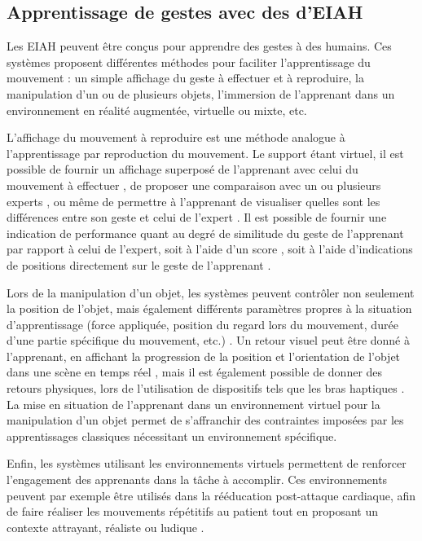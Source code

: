 \subsection{Apprentissage de gestes avec des d'EIAH}
Les EIAH peuvent être conçus pour apprendre des gestes à des humains. Ces systèmes proposent différentes méthodes pour faciliter l'apprentissage du mouvement : un simple affichage du geste à effectuer et à reproduire, la manipulation d'un ou de plusieurs objets, l'immersion de l'apprenant dans un environnement en réalité augmentée, virtuelle ou mixte, etc.

L'affichage du mouvement à reproduire est une méthode analogue à l'apprentissage par reproduction du mouvement. Le support étant virtuel, il est possible de fournir un affichage superposé de l'apprenant avec celui du mouvement à effectuer \parencite{Kora20151559}, de proposer une comparaison avec un ou plusieurs experts \parencite{Yoshinaga2015Doa}, ou même de permettre à l'apprenant de visualiser quelles sont les différences entre son geste et celui de l'expert \parencite{Chan2011}. Il est possible de fournir une indication de performance quant au degré de similitude du geste de l'apprenant par rapport à celui de l'expert, soit à l'aide d'un score \parencite{Maes2012DtM}, soit à l'aide d'indications de positions directement sur le geste de l'apprenant \parencite{YAMAOKA2013912}.

Lors de la manipulation d'un objet, les systèmes peuvent contrôler non seulement la position de l'objet, mais également différents paramètres propres à la situation d'apprentissage (force appliquée, position du regard lors du mouvement, durée d'une partie spécifique du mouvement, etc.) \parencite{Chellali2016Aia}. Un retour visuel peut être donné à l'apprenant, en affichant la progression de la position et l'orientation de l'objet dans une scène en temps réel \parencite{Choi2015103}, mais il est également possible de donner des retours physiques, lors de l'utilisation de dispositifs tels que les bras haptiques \parencite{Gillespie2018Hit}. La mise en situation de l'apprenant dans un environnement virtuel pour la manipulation d'un objet permet de s'affranchir des contraintes imposées par les apprentissages classiques nécessitant un environnement spécifique.

Enfin, les systèmes utilisant les environnements virtuels permettent de renforcer l'engagement des apprenants dans la tâche à accomplir. Ces environnements peuvent par exemple être utilisés dans la rééducation post-attaque cardiaque, afin de faire réaliser les mouvements répétitifs au patient tout en proposant un contexte attrayant, réaliste \parencite{Baldominos2015AAt} ou ludique \parencite{Alankus2010TCG}.

